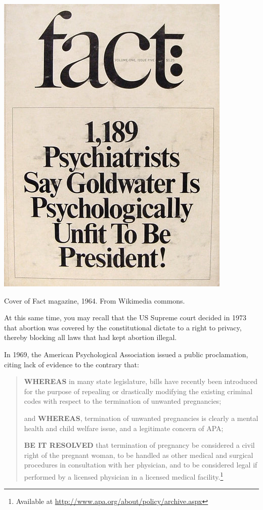 \begin{refsection}
\begin{marginfigure}
\begin{center}
     \includegraphics{../images/Goldwater_fact_magazine.jpg}
\end{center}
 \caption{Cover of Fact magazine, 1964. From Wikimedia commons.}
\label{fig: 1964Fact}
\end{marginfigure}


At this same time, you may recall that the US Supreme court decided in 1973 that abortion was covered by the constitutional dictate to a right to privacy, thereby blocking all laws that had kept abortion illegal.

In 1969, the American Psychological Association issued a public proclamation, citing lack of evidence to the contrary that:

\begin{quote}

\textbf{WHEREAS} in many state legislature, bills have recently been introduced for the purpose of repealing or drastically modifying the existing criminal codes with respect to the termination of unwanted pregnancies;

and \textbf{WHEREAS}, termination of unwanted pregnancies is clearly a mental health and child welfare issue, and a legitimate concern of APA;

\textbf{BE IT RESOLVED} that termination of pregnancy be considered a civil right of the pregnant woman, to be handled as other medical and surgical procedures in consultation with her physician, and to be considered legal if performed by a licensed physician in a licensed medical facility.\footnote{Available at \url{http://www.apa.org/about/policy/archive.aspx}}
\end{quote}


\end{refsection}
